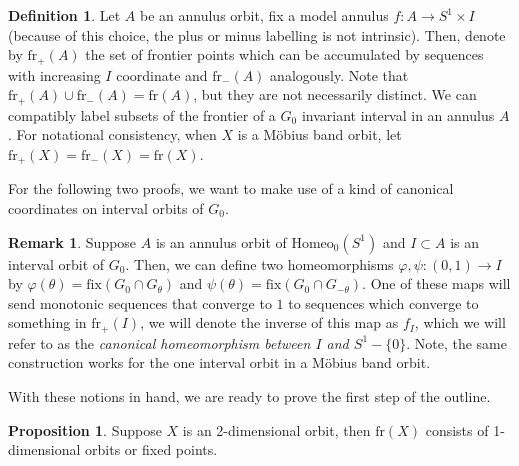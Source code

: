 \documentclass[10pt, oneside]{article}
\newcommand{\homeo}[1][S^1]{\text{Homeo}_0(#1)}
\theoremstyle{definition}
\newtheorem{defn}{Definition}[section]
\newtheorem{rem}{Remark}[section]
\newtheorem{prop}{Proposition}[section]
\theoremstyle{definition}
\begin{document}
\begin{defn}
    Let $A$ be an annulus orbit, fix a model annulus $f:A\to S^1\times I$ (because of this choice, the plus or minus labelling is not intrinsic). Then, denote by $\text{fr}_+(A)$ the set of frontier points which can be accumulated by sequences with increasing $I$ coordinate and $\text{fr}_-(A)$ analogously. Note that $\text{fr}_+(A)\cup\text{fr}_-(A) = \text{fr}(A)$, but they are not necessarily distinct. We can compatibly label subsets of the frontier of a $G_0$ invariant interval in an annulus $A$. For notational consistency, when $X$ is a M\"{o}bius band orbit, let $\text{fr}_+(X) = \text{fr}_-(X) = \text{fr}(X)$.
\end{defn}

For the following two proofs, we want to make use of a kind of canonical coordinates on interval orbits of $G_0$.

\begin{rem}\cite{chen:StructureTheorems}
    Suppose $A$ is an annulus orbit of $\homeo$ and $I\subset A$ is an interval orbit of $G_0$. Then, we can define two homeomorphisms $\varphi, \psi:(0,1) \to I$ by $\varphi(\theta) = \text{fix}(G_0\cap G_\theta)$ and $\psi(\theta) = \text{fix}(G_0\cap G_{-\theta})$. One of these maps will send monotonic sequences that converge to $1$ to sequences which converge to something in $\text{fr}_+(I)$, we will denote the inverse of this map as $f_I$, which we will refer to as the {\it canonical homeomorphism between $I$ and $S^1 - \{0\}$}. Note, the same construction works for the one interval orbit in a M\"{o}bius band orbit.
\end{rem}

With these notions in hand, we are ready to prove the first step of the outline.

\begin{prop}
    Suppose $X$ is an 2-dimensional orbit, then $\text{fr}(X)$ consists of 1-dimensional orbits or fixed points.
\end{prop}
\end{document}
